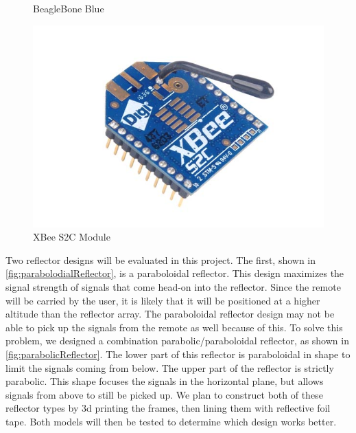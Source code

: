 \documentclass[letterpaper,12pt]{article}   %
\begin{document}
\begin{figure}
\begin{minipage}[t]{0.32\textwidth}
    \captionsetup{width=\textwidth}
    \caption{BeagleBone Blue}
    \label{fig:beagleboneBlue}
  \end{minipage}
  \begin{minipage}[t]{0.32\textwidth}
    \includegraphics[width=1\textwidth]{figs/img/Xbee-S2C-Module}
    \captionsetup{width=\textwidth}
    \caption{XBee S2C Module}
    \label{fig:XBeeModule}
  \end{minipage}
\end{figure}

\vspace*{12pt}
\noindent
Two reflector designs  will be evaluated in this project. The first, shown in
\autoref{fig:parabolodialReflector}, is a paraboloidal reflector. This design
maximizes the signal strength of signals that come head-on into the reflector.
Since the remote will be carried by the user, it is likely that it will be
positioned at a higher altitude than the reflector array. The paraboloidal
reflector design may not be able to pick up the signals from the remote as well
because of this. To solve this problem, we designed a combination
parabolic/paraboloidal reflector, as shown in \autoref{fig:parabolicReflector}.
The lower part of this reflector is paraboloidal in shape to limit the signals
coming from below. The upper part of the reflector is strictly parabolic. This
shape focuses the signals in the horizontal plane, but allows signals from above
to still be picked up. We plan to construct both of these reflector types by 3d
printing the frames, then lining them with reflective foil tape. Both models
will then be tested to determine which design works better.
\end{document}
